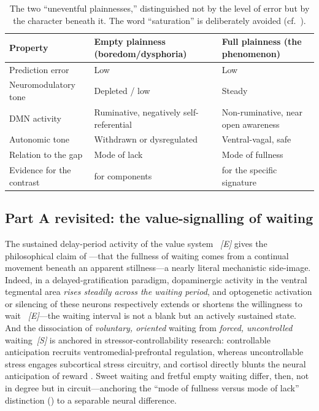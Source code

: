 \begin{table}[t]
\caption{The two ``uneventful plainnesses,'' distinguished not by the level of error but by the character beneath it. The word ``saturation'' is deliberately avoided (cf.\ ).}
\label{p19:tab:neuro-modes}
\small
\begin{tabularx}{\linewidth}{>{\RaggedRight\arraybackslash}p{3.2cm} >{\RaggedRight\arraybackslash}X >{\RaggedRight\arraybackslash}X}
\toprule
\textbf{Property} & \textbf{Empty plainness (boredom/dysphoria)} & \textbf{Full plainness (the phenomenon)} \\
\midrule
Prediction error & Low & Low \\
Neuromodulatory tone & Depleted / low & Steady \\
DMN activity & Ruminative, negatively self-referential & Non-ruminative, near open awareness \\
Autonomic tone & Withdrawn or dysregulated & Ventral-vagal, safe \\
Relation to the gap & Mode of lack & Mode of fullness \\
Evidence for the contrast & [E] for components & [H] for the specific signature \\
\bottomrule
\end{tabularx}
\end{table}

\subsection{Part A revisited: the value-signalling of waiting}
\label{p19:sub:neuro-waiting}

The sustained delay-period activity of the value system \parencite{schultz1997,hamid2016}~\emph{[E]} gives the philosophical claim of ---that the fullness of waiting comes from a continual movement beneath an apparent stillness---a nearly literal mechanistic side-image. Indeed, in a delayed-gratification paradigm, dopaminergic activity in the ventral tegmental area \emph{rises steadily across the waiting period}, and optogenetic activation or silencing of these neurons respectively extends or shortens the willingness to wait \parencite{wang2021delayed}~\emph{[E]}---the waiting interval is not a blank but an actively sustained state. And the dissociation of \emph{voluntary, oriented} waiting from \emph{forced, uncontrolled} waiting~\emph{[S]} is anchored in stressor-controllability research: controllable anticipation recruits ventromedial-prefrontal regulation, whereas uncontrollable stress engages subcortical stress circuitry, and cortisol directly blunts the neural anticipation of reward \parencite{wood2021controllability,kinner2016}. Sweet waiting and fretful empty waiting differ, then, not in degree but in circuit---anchoring the ``mode of fullness versus mode of lack'' distinction () to a separable neural difference.

